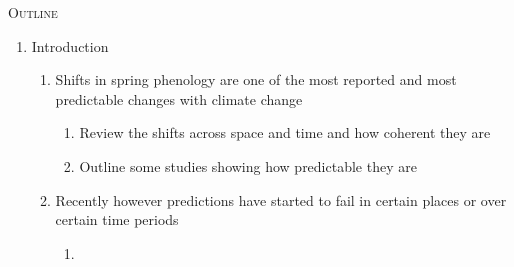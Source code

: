 \documentclass[11pt,letterpaper]{article}
\renewcommand{\section}[1]{%
\bigskip
\begin{center}
\begin{Large}
\normalfont\scshape #1
\medskip
\end{Large}
\end{center}}
\begin{document}
\section{Outline}
\begin{enumerate}
\item Introduction 
\begin{enumerate}
\item Shifts in spring phenology are one of the most reported and most predictable changes with climate change
\begin{enumerate}
\item Review the shifts across space and time and how coherent they are
\item Outline some studies showing how predictable they are \citep{Schwartz:1997nn,Ellwood2012} 
\end{enumerate}
\item Recently however predictions have started to fail in certain places or over certain time periods
\begin{enumerate}
\item \citet{yu2010,fu2015}  %

\end{enumerate}
\end{enumerate}
\end{enumerate}
\end{document}
